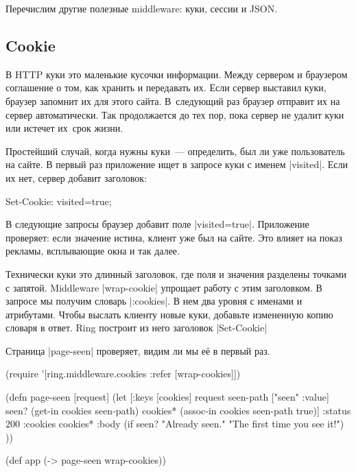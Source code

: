 Перечислим другие полезные middleware: куки, сессии и JSON.

\subsection{Cookie}

В HTTP куки это маленькие кусочки информации. Между сервером и браузером
соглашение о том, как хранить и передавать их. Если сервер выставил куки,
браузер запомнит их для этого сайта. В~следующий раз браузер отправит их на
сервер автоматически. Так продолжается до тех пор, пока сервер не удалит куки
или истечет их~срок жизни.

Простейший случай, когда нужны куки~--- определить, был ли уже пользователь на
сайте. В первый раз приложение ищет в запросе куки с именем
\spverb|visited|. Если их нет, сервер добавит заголовок:

\begin{english}
  \begin{http}
Set-Cookie: visited=true;
  \end{http}
\end{english}

В следующие запросы браузер добавит поле \spverb|visited=true|. Приложение
проверяет: если значение истина, клиент уже был на сайте.  Это влияет на
показ рекламы, всплывающие окна и так далее.

Технически куки это длинный заголовок, где поля и значения разделены точками с
запятой. Middleware \spverb|wrap-cookie| упрощает работу с этим заголовком. В
запросе мы получим словарь \spverb|:cookies|. В нем два уровня с именами и
атрибутами. Чтобы выслать клиенту новые куки, добавьте измененную копию словаря
в ответ. Ring построит из него заголовок \spverb|Set-Cookie|

Страница \spverb|page-seen| проверяет, видим ли мы е\"{е} в первый раз.

\begin{english}
  \begin{clojure}
(require '[ring.middleware.cookies
           :refer [wrap-cookies]])

(defn page-seen [request]
  (let [{:keys [cookies]} request
        seen-path ["seen" :value]
        seen? (get-in cookies seen-path)
        cookies* (assoc-in cookies seen-path true)]
    {:status 200
     :cookies cookies*
     :body (if seen?
             "Already seen."
             "The first time you see it!") }))

(def app (-> page-seen
             wrap-cookies))
  \end{clojure}
\end{english}

